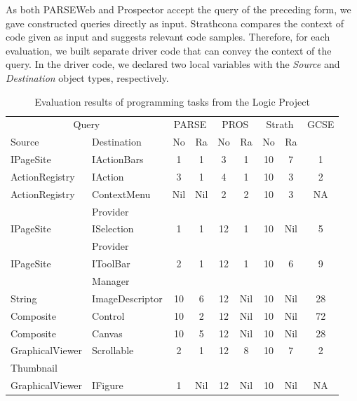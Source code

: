 As both PARSEWeb and Prospector accept the query of the preceding
form, we gave constructed queries directly as input. Strathcona
compares the context of code given as input and  suggests relevant
code samples. Therefore, for each evaluation, we built separate
driver code that can convey the context of the query. In the driver
code, we declared two local variables with the \emph{Source} and
\emph{Destination} object types, respectively.

\setlength{\tabcolsep}{1pt}
\begin{table}[t]
\begin{SmallOut}
\begin{CodeOut}
\begin{center}
\centering \caption {\label{tab:realprojevaluation} Evaluation results of programming tasks from
the Logic Project}
\begin {tabular} {|l|l|c|c|c|c|c|c|c|}
\hline
\multicolumn{2}{|c|}{Query}&\multicolumn{2}{|c|}{PARSE}&\multicolumn{2}{|c|}{PROS}&\multicolumn{2}{|c|}{Strath}&GCSE\\
\cline{1-8}
Source&Destination&No&Ra&No&Ra&No&Ra&\\
\hline
\hline IPageSite&IActionBars&1&1&3&1&10&7&1\\
\hline ActionRegistry&IAction&3&1&4&1&10&3&2\\
\hline ActionRegistry&ContextMenu&Nil&Nil&2&2&10&3&NA\\
                &Provider&&&&&&&\\
\hline IPageSite&ISelection&1&1&12&1&10&Nil&5\\
             &Provider&&&&&&&\\
\hline IPageSite&IToolBar&2&1&12&1&10&6&9\\
              &Manager&&&&&&&\\
\hline String&ImageDescriptor&10&6&12&Nil&10&Nil&28\\
\hline Composite&Control&10&2&12&Nil&10&Nil&72\\
\hline Composite&Canvas&10&5&12&Nil&10&Nil&28\\
\hline GraphicalViewer&Scrollable&2&1&12&8&10&7&2\\
              Thumbnail&&&&&&&&\\
\hline GraphicalViewer&IFigure&1&Nil&12&Nil&10&Nil&NA\\
\hline
\end{tabular}
\end{center}
\end{CodeOut}
\end{SmallOut}
\vspace*{-6ex}
\end{table}
